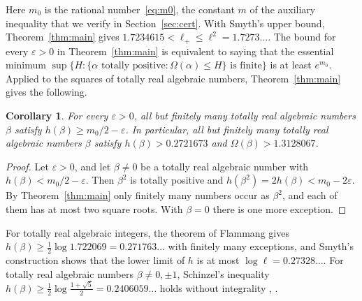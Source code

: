 \documentclass[11pt]{amsart}
\newtheorem{corollary}[theorem]{Corollary}
\theoremstyle{remark}
\numberwithin{equation}{section}
\newcommand{\EMzero}{1.7234615}
\newcommand{\HalfM}{0.2721673}
\newcommand{\EHalfM}{1.3128067}
\newcommand{\FlamVal}{1.722069}
\newcommand{\FlamHalf}{0.271763}
\newcommand{\SmyEllSq}{1.7273}
\newcommand{\SchinzelHalf}{0.2406059}
\begin{document}
Here $m_0$ is the rational number~\eqref{eq:m0}, the constant $m$ of the auxiliary inequality that we verify in Section~\ref{sec:cert}. With Smyth's upper bound, Theorem~\ref{thm:main} gives $\EMzero<\ell_+\le\ell^2=\SmyEllSq\ldots$. The bound for every $\varepsilon>0$ in Theorem~\ref{thm:main} is equivalent to saying that the essential minimum $\sup\{H:\{\alpha\text{ totally positive}:\Omega(\alpha)\le H\}\text{ is finite}\}$ is at least $e^{m_0}$. Applied to the squares of totally real algebraic numbers, Theorem~\ref{thm:main} gives the following.

\begin{corollary}\label{cor:real}
For every $\varepsilon>0$, all but finitely many totally real algebraic numbers $\beta$ satisfy $h(\beta)\ge m_0/2-\varepsilon$. In particular, all but finitely many totally real algebraic numbers $\beta$ satisfy $h(\beta)>\HalfM$ and $\Omega(\beta)>\EHalfM$.
\end{corollary}

\begin{proof}
Let $\varepsilon>0$, and let $\beta\ne0$ be a totally real algebraic number with $h(\beta)<m_0/2-\varepsilon$. Then $\beta^2$ is totally positive and $h(\beta^2)=2h(\beta)<m_0-2\varepsilon$. By Theorem~\ref{thm:main} only finitely many numbers occur as $\beta^2$, and each of them has at most two square roots. With $\beta=0$ there is one more exception.
\end{proof}

For totally real algebraic integers, the theorem of Flammang \cite{Fla15} gives $h(\beta)\ge\frac12\log\FlamVal=\FlamHalf\ldots$ with finitely many exceptions, and Smyth's construction shows that the lower limit of $h$ is at most $\log\ell=0.27328\ldots$. For totally real algebraic numbers $\beta\ne0,\pm1$, Schinzel's inequality $h(\beta)\ge\frac12\log\frac{1+\sqrt5}2=\SchinzelHalf\ldots$ holds without integrality \cite[Theorem~1]{Gar07}, \cite[Section~6.1]{Smy08}.
\end{document}
